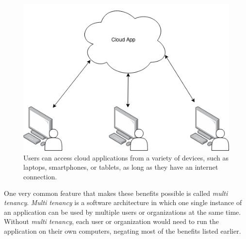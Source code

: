 \begin{figure}[H]
	\centering
	\includegraphics[scale=0.5]{images/basic-cloud-services.drawio.png}
	\caption{Users can access cloud applications from a variety of devices, such as laptops, smartphones, or tablets, as long as they have an internet connection.}
	\label{fig:cloud-applications}
	\vspace{-1em} %
\end{figure}



One very common feature that makes these benefits possible is called \textit{multi tenancy}.
\textit{Multi tenancy} is a software architecture in which one single instance of an application
can be used by multiple users or organizations at the same time.
Without \textit{multi tenancy}, each user or organization would need to run the application on
their own computers,
negating most of the benefits listed earlier.

